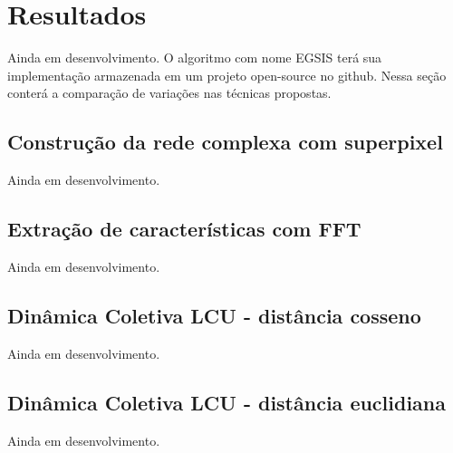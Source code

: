 \chapter{Resultados}\label{chap:resultados}

Ainda em desenvolvimento. O algoritmo com nome EGSIS terá sua
implementação armazenada em um projeto open-source no github. Nessa
seção conterá a comparação de variações nas técnicas propostas.


\section{Construção da rede complexa com superpixel}\label{sec:resultados-rede-complexa-superpixel}

Ainda em desenvolvimento.


\section{Extração de características com FFT}\label{sec:resultados-extracao-de-caracteristicas--fft}

Ainda em desenvolvimento.


\section{Dinâmica Coletiva LCU - distância cosseno }\label{sec:resultados-dinamica-coletiva-lcu-cos}

Ainda em desenvolvimento.

\section{Dinâmica Coletiva LCU - distância euclidiana}\label{sec:resultados-dinamica-coletiva-euclidiana}

Ainda em desenvolvimento.
